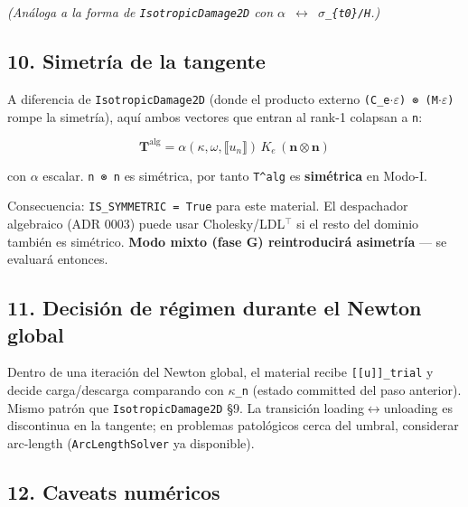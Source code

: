 \documentclass[11pt,letterpaper,oneside]{report}
\begin{document}
  \textit{(Análoga a la forma de \texttt{IsotropicDamage2D} con \texttt{\ensuremath{\alpha} \ensuremath{\leftrightarrow} \ensuremath{\sigma}\_\{t0\}/H}.)}

\subsection{10. Simetría de la tangente}

A diferencia de \texttt{IsotropicDamage2D} (donde el producto externo \texttt{(C\_e\ensuremath{\cdot}\ensuremath{\varepsilon}) ⊗ (M\ensuremath{\cdot}\ensuremath{\varepsilon})} rompe la simetría), aquí ambos vectores que entran al rank-1 colapsan a \texttt{n}:

\[
\mathbf T^\text{alg} = \alpha(\kappa, \omega, \llbracket u_n\rrbracket)\,K_e\,(\mathbf n \otimes \mathbf n)
\]

con \texttt{\ensuremath{\alpha}} escalar. \texttt{n ⊗ n} es simétrica, por tanto \texttt{T\textasciicircum{}alg} es \textbf{simétrica} en Modo-I.

Consecuencia: \texttt{IS\_SYMMETRIC = True} para este material. El despachador algebraico (ADR 0003) puede usar Cholesky/LDL\ensuremath{^{\top}} si el resto del dominio también es simétrico. \textbf{Modo mixto (fase G) reintroducirá asimetría} --- se evaluará entonces.

\subsection{11. Decisión de régimen durante el Newton global}

Dentro de una iteración del Newton global, el material recibe \texttt{[[u]]\_trial} y decide carga/descarga comparando con \texttt{\ensuremath{\kappa}\_n} (estado committed del paso anterior). Mismo patrón que \texttt{IsotropicDamage2D} §9. La transición loading\ensuremath{\leftrightarrow}unloading es discontinua en la tangente; en problemas patológicos cerca del umbral, considerar arc-length (\texttt{ArcLengthSolver} ya disponible).

\subsection{12. Caveats numéricos}
\end{document}
